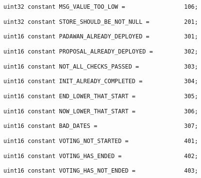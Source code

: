 \begin{lstlisting}[firstnumber=11]
    uint32 constant MSG_VALUE_TOO_LOW =                 106;
\end{lstlisting}

\begin{lstlisting}[firstnumber=13]
    uint32 constant STORE_SHOULD_BE_NOT_NULL =          201;
\end{lstlisting}

\begin{lstlisting}[firstnumber=15]
    uint16 constant PADAWAN_ALREADY_DEPLOYED =          301;
\end{lstlisting}

\begin{lstlisting}[firstnumber=16]
    uint16 constant PROPOSAL_ALREADY_DEPLOYED =         302;
\end{lstlisting}

\begin{lstlisting}[firstnumber=17]
    uint16 constant NOT_ALL_CHECKS_PASSED =             303;
\end{lstlisting}

\begin{lstlisting}[firstnumber=18]
    uint16 constant INIT_ALREADY_COMPLETED =            304;
\end{lstlisting}

\begin{lstlisting}[firstnumber=19]
    uint16 constant END_LOWER_THAT_START =              305;
\end{lstlisting}

\begin{lstlisting}[firstnumber=20]
    uint16 constant NOW_LOWER_THAT_START =              306;
\end{lstlisting}

\begin{lstlisting}[firstnumber=21]
    uint16 constant BAD_DATES =                         307;
\end{lstlisting}

\begin{lstlisting}[firstnumber=23]
    uint16 constant VOTING_NOT_STARTED =                401;
\end{lstlisting}

\begin{lstlisting}[firstnumber=24]
    uint16 constant VOTING_HAS_ENDED =                  402;
\end{lstlisting}

\begin{lstlisting}[firstnumber=25]
    uint16 constant VOTING_HAS_NOT_ENDED =              403;
\end{lstlisting}

